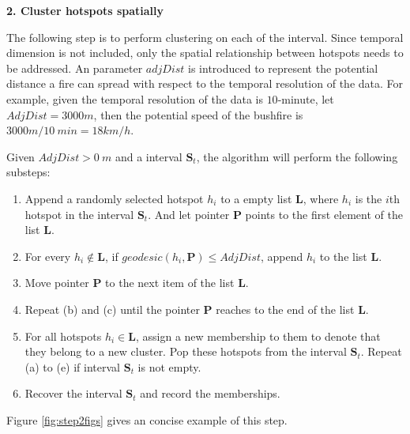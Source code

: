 \textbf{2. Cluster hotspots spatially}

The following step is to perform clustering on each of the interval.
Since temporal dimension is not included, only the spatial relationship
between hotspots needs to be addressed. An parameter \(adjDist\) is
introduced to represent the potential distance a fire can spread with
respect to the temporal resolution of the data. For example, given the
temporal resolution of the data is \(10\)-minute, let
\(AdjDist = 3000 m\), then the potential speed of the bushfire is
\(3000m/10~min = 18km/h\).

Given \(AdjDist>0~m\) and a interval \(\boldsymbol{S}_t\), the algorithm
will perform the following substeps:

\begin{enumerate}
\def\labelenumi{(\alph{enumi})}
\item
  Append a randomly selected hotspot \(h_i\) to a empty list
  \(\boldsymbol{L}\), where \(h_i\) is the \(i\)th hotspot in the
  interval \(\boldsymbol{S}_t\). And let pointer \(\boldsymbol{P}\)
  points to the first element of the list \(\boldsymbol{L}\).
\item
  For every \(h_i \notin \boldsymbol{L}\), if
  \(geodesic(h_i, \boldsymbol{P})\leq AdjDist\), append \(h_i\) to the
  list \(\boldsymbol{L}\).
\item
  Move pointer \(\boldsymbol{P}\) to the next item of the list
  \(\boldsymbol{L}\).
\item
  Repeat (b) and (c) until the pointer \(\boldsymbol{P}\) reaches to the
  end of the list \(\boldsymbol{L}\).
\item
  For all hotspots \(h_i \in \boldsymbol{L}\), assign a new membership
  to them to denote that they belong to a new cluster. Pop these
  hotspots from the interval \(\boldsymbol{S}_t\). Repeat (a) to (e) if
  interval \(\boldsymbol{S}_t\) is not empty.
\item
  Recover the interval \(\boldsymbol{S}_t\) and record the memberships.
\end{enumerate}

Figure \ref{fig:step2figs} gives an concise example of this step.

